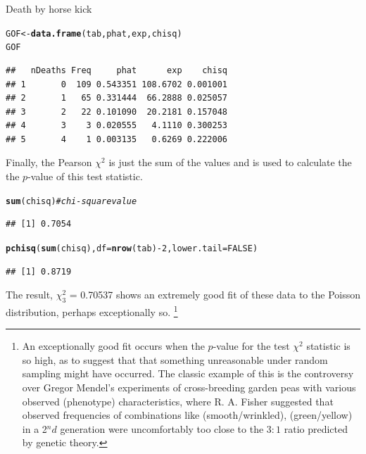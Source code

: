 \documentclass[11pt]{book}\usepackage[]{graphicx}\usepackage[]{color}
\makeatletter
\newcommand{\hlnum}[1]{\textcolor[rgb]{0.686,0.059,0.569}{#1}}%
\newcommand{\hlcom}[1]{\textcolor[rgb]{0.678,0.584,0.686}{\textit{#1}}}%
\newcommand{\hlopt}[1]{\textcolor[rgb]{0,0,0}{#1}}%
\newcommand{\hlstd}[1]{\textcolor[rgb]{0.345,0.345,0.345}{#1}}%
\newcommand{\hlkwb}[1]{\textcolor[rgb]{0.69,0.353,0.396}{#1}}%
\newcommand{\hlkwc}[1]{\textcolor[rgb]{0.333,0.667,0.333}{#1}}%
\newcommand{\hlkwd}[1]{\textcolor[rgb]{0.737,0.353,0.396}{\textbf{#1}}}%
\newenvironment{kframe}{%
 \def\at@end@of@kframe{}%
 \ifinner\ifhmode%
  \def\at@end@of@kframe{\end{minipage}}%
  \begin{minipage}{\columnwidth}%
 \fi\fi%
 \def\FrameCommand##1{\hskip\@totalleftmargin \hskip-\fboxsep
 \colorbox{shadecolor}{##1}\hskip-\fboxsep
     \hskip-\linewidth \hskip-\@totalleftmargin \hskip\columnwidth}%
 \MakeFramed {\advance\hsize-\width
   \@totalleftmargin\z@ \linewidth\hsize
   \@setminipage}}%
 {\par\unskip\endMakeFramed%
 \at@end@of@kframe}
\newenvironment{knitrout}{}{} %
\renewenvironment{knitrout}{\small\renewcommand{\baselinestretch}{.85}}{} %
\makeatother
\begin{document}
\begin{Example}[horsekick3]{Death by horse kick}
\begin{knitrout}
\begin{kframe}
\begin{alltt}
\hlstd{GOF} \hlkwb{<-} \hlkwd{data.frame}\hlstd{(tab, phat, exp, chisq)}
\hlstd{GOF}
\end{alltt}
\begin{verbatim}
##   nDeaths Freq     phat      exp    chisq
## 1       0  109 0.543351 108.6702 0.001001
## 2       1   65 0.331444  66.2888 0.025057
## 3       2   22 0.101090  20.2181 0.157048
## 4       3    3 0.020555   4.1110 0.300253
## 5       4    1 0.003135   0.6269 0.222006
\end{verbatim}
\end{kframe}
\end{knitrout}

Finally, the Pearson $\chi^2$ is just the sum of the 
values and  is used to calculate the the
$p$-value of this test statistic.

\begin{knitrout}
\color{fgcolor}\begin{kframe}
\begin{alltt}
\hlkwd{sum}\hlstd{(chisq)}  \hlcom{# chi-square value}
\end{alltt}
\begin{verbatim}
## [1] 0.7054
\end{verbatim}
\begin{alltt}
\hlkwd{pchisq}\hlstd{(}\hlkwd{sum}\hlstd{(chisq),} \hlkwc{df}\hlstd{=}\hlkwd{nrow}\hlstd{(tab)}\hlopt{-}\hlnum{2}\hlstd{,} \hlkwc{lower.tail}\hlstd{=}\hlnum{FALSE}\hlstd{)}
\end{alltt}
\begin{verbatim}
## [1] 0.8719
\end{verbatim}
\end{kframe}
\end{knitrout}

The result, $\chi^2_3$ = 0.70537 shows an 
extremely good fit of these data to the Poisson distribution,
perhaps exceptionally so.%
\footnote{
An exceptionally good fit occurs when the $p$-value for
the test $\chi^2$ statistic is so high, as to suggest that
that something unreasonable under random sampling might have
occurred.  The classic example of this is the 
controversy over Gregor Mendel's experiments of cross-breeding
garden peas with various observed (phenotype) characteristics,
where R. A. Fisher \citeyear{Fisher:1936:Mendel} suggested that
observed frequencies of combinations like (smooth/wrinkled),
(green/yellow) in a 2$^nd$ generation were uncomfortably too
close to the $3:1$ ratio predicted by genetic theory.  
}

\end{Example}
\end{document}
